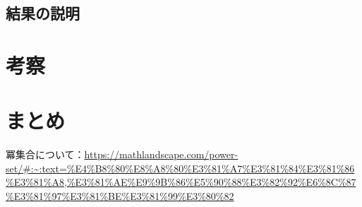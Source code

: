 \documentclass[dvipdfmx]{jsarticle}
\begin{document}
\subsection{結果の説明}

\section{考察}
\section{まとめ}

\begin{thebibliography}{99}
  \bibitem 冪集合について：\url{https://mathlandscape.com/power-set/#:~:text=%E4%B8%80%E8%A8%80%E3%81%A7%E3%81%84%E3%81%86%E3%81%A8,%E3%81%AE%E9%9B%86%E5%90%88%E3%82%92%E6%8C%87%E3%81%97%E3%81%BE%E3%81%99%E3%80%82}
\end{thebibliography}
\end{document}
